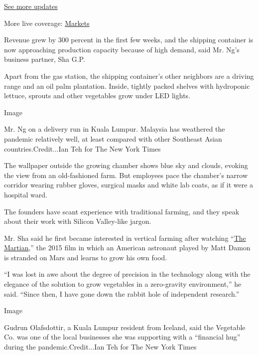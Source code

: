 \href{https://www.nytimes3xbfgragh.onion/2020/09/11/world/covid-19-coronavirus.html?action=click\&pgtype=Article\&state=default\&region=MAIN_CONTENT_1\&context=storylines_live_updates}{See
more updates}

More live coverage:
\href{https://www.nytimes3xbfgragh.onion/live/2020/09/11/business/stock-market-today-coronavirus?action=click\&pgtype=Article\&state=default\&region=MAIN_CONTENT_1\&context=storylines_live_updates}{Markets}

Revenue grew by 300 percent in the first few weeks, and the shipping
container is now approaching production capacity because of high demand,
said Mr. Ng's business partner, Sha G.P.

Apart from the gas station, the shipping container's other neighbors are
a driving range and an oil palm plantation. Inside, tightly packed
shelves with hydroponic lettuce, sprouts and other vegetables grow under
LED lights.

Image

Mr. Ng on a delivery run in Kuala Lumpur. Malaysia has weathered the
pandemic relatively well, at least compared with other Southeast Asian
countries.Credit...Ian Teh for The New York Times

The wallpaper outside the growing chamber shows blue sky and clouds,
evoking the view from an old-fashioned farm. But employees pace the
chamber's narrow corridor wearing rubber gloves, surgical masks and
white lab coats, as if it were a hospital ward.

The founders have scant experience with traditional farming, and they
speak about their work with Silicon Valley-like jargon.

Mr. Sha said he first became interested in vertical farming after
watching
``\href{https://www.nytimes3xbfgragh.onion/2015/10/02/movies/review-in-the-martian-marooned-but-not-alone.html}{The
Martian},'' the 2015 film in which an American astronaut played by Matt
Damon is stranded on Mars and learns to grow his own food.

``I was lost in awe about the degree of precision in the technology
along with the elegance of the solution to grow vegetables in a
zero-gravity environment,'' he said. ``Since then, I have gone down the
rabbit hole of independent research.''

Image

Gudrun Olafsdottir, a Kuala Lumpur resident from Iceland, said the
Vegetable Co. was one of the local businesses she was supporting with a
``financial hug'' during the pandemic.Credit...Ian Teh for The New York
Times

